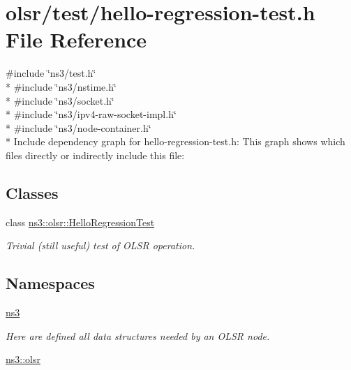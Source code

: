 \hypertarget{hello-regression-test_8h}{}\section{olsr/test/hello-\/regression-\/test.h File Reference}
\label{hello-regression-test_8h}
{\ttfamily \#include \char`\"{}ns3/test.\+h\char`\"{}}\\*
{\ttfamily \#include \char`\"{}ns3/nstime.\+h\char`\"{}}\\*
{\ttfamily \#include \char`\"{}ns3/socket.\+h\char`\"{}}\\*
{\ttfamily \#include \char`\"{}ns3/ipv4-\/raw-\/socket-\/impl.\+h\char`\"{}}\\*
{\ttfamily \#include \char`\"{}ns3/node-\/container.\+h\char`\"{}}\\*
Include dependency graph for hello-\/regression-\/test.h\+:
This graph shows which files directly or indirectly include this file\+:
\subsection*{Classes}
\begin{DoxyCompactItemize}
\item 
class \hyperlink{classns3_1_1olsr_1_1HelloRegressionTest}{ns3\+::olsr\+::\+Hello\+Regression\+Test}
\begin{DoxyCompactList}\small\item\em Trivial (still useful) test of O\+L\+SR operation. \end{DoxyCompactList}\end{DoxyCompactItemize}
\subsection*{Namespaces}
\begin{DoxyCompactItemize}
\item 
 \hyperlink{namespacens3}{ns3}
\begin{DoxyCompactList}\small\item\em Here are defined all data structures needed by an O\+L\+SR node. \end{DoxyCompactList}\item 
 \hyperlink{namespacens3_1_1olsr}{ns3\+::olsr}
\end{DoxyCompactItemize}
